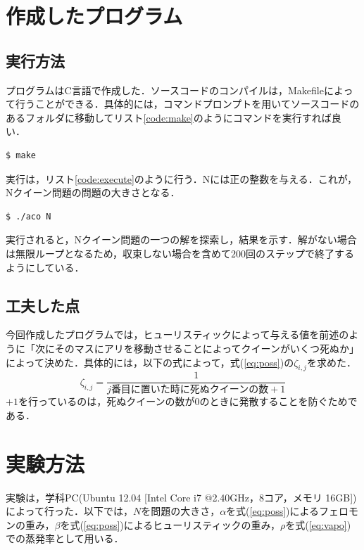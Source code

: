 \documentclass{jarticle}
\begin{document}
\section{作成したプログラム}
\subsection{実行方法}
プログラムはC言語で作成した．ソースコードのコンパイルは，Makefileによって行うことができる．具体的には，コマンドプロンプトを用いてソースコードのあるフォルダに移動してリスト\ref{code:make}のようにコマンドを実行すれば良い．
\lstset{style=customplain}
\begin{lstlisting}[caption={make},label=code:make]
$ make
\end{lstlisting}

実行は，リスト\ref{code:execute}のように行う．Nには正の整数を与える．これが，Nクイーン問題の問題の大きさとなる．
\begin{lstlisting}[caption={実行},label=code:execute]
$ ./aco N
\end{lstlisting}

実行されると，Nクイーン問題の一つの解を探索し，結果を示す．解がない場合は無限ループとなるため，収束しない場合を含めて$200$回のステップで終了するようにしている．

\subsection{工夫した点}
今回作成したプログラムでは，ヒューリスティックによって与える値を前述のように「次にそのマスにアリを移動させることによってクイーンがいくつ死ぬか」によって決めた．具体的には，以下の式によって，式(\ref{eq:poss})の$\zeta_{i,j}$を求めた．
\begin{equation}
	\zeta_{i,j} = \frac{1}{j\text{番目に置いた時に死ぬクイーンの数} + 1}
\end{equation}
$+1$を行っているのは，死ぬクイーンの数が$0$のときに発散することを防ぐためである．



\section{実験方法}
実験は，学科PC(Ubuntu 12.04 [Intel Core i7 @2.40GHz，8コア，メモリ 16GB]) によって行った．以下では，$N$を問題の大きさ，$\alpha$を式(\ref{eq:poss})によるフェロモンの重み，$\beta$を式(\ref{eq:poss})によるヒューリスティックの重み，$\rho$を式(\ref{eq:vapo})での蒸発率として用いる．
\end{document}
